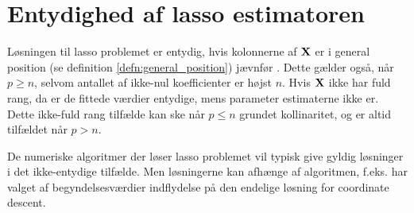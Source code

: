 \section{Entydighed af lasso estimatoren}
Løsningen til lasso problemet er entydig, hvis kolonnerne af \(\mathbf{X}\) er i general position (se definition \ref{defn:general_position}) jævnfør \citep{lasso_unique}.
Dette gælder også, når \(p \geq n\), selvom antallet af ikke-nul koefficienter er højst \(n\).
Hvis \(\mathbf{X}\) ikke har fuld rang, da er de fittede værdier entydige, mens parameter estimaterne ikke er.
Dette ikke-fuld rang tilfælde kan ske når \(p \leq n\) grundet kollinaritet, og er altid tilfældet når \(p>n\).

De numeriske algoritmer der løser lasso problemet vil typisk give gyldig løsninger i det ikke-entydige tilfælde.
Men løsningerne kan afhænge af algoritmen, f.eks. har valget af begyndelsesværdier indflydelse på den endelige løsning for coordinate descent.

%


